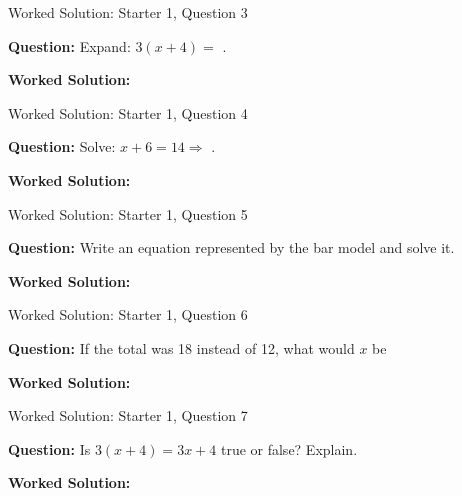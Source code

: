 \documentclass{beamer}
\newcommand{\ablank}[1]{%
  \alt<2>{\textcolor{red}{#1}}{\underline{\phantom{#1}}}%
}
\newcommand{\ashow}[1]{\uncover<2->{\textcolor{red}{\small #1}}}
\newcommand{\ashowq}[1]{\alt<2->{\textcolor{red}{\small #1}}{?}}
\begin{document}
\begin{frame}{Worked Solution: Starter 1, Question 3}

\textbf{Question:} Expand: $3(x+4)=$\ablank{$3x+12$}.

\textbf{Worked Solution:} \ashow{Multiply each term inside the bracket by $3$: $3(x+4)=3x+12$.}

\end{frame}

\begin{frame}{Worked Solution: Starter 1, Question 4}

\textbf{Question:} Solve: $x+6=14 \Rightarrow$\ablank{$x=8$}.

\textbf{Worked Solution:} \ashow{Subtract $6$ from both sides: $x=14-6=8$.}

\end{frame}

\begin{frame}{Worked Solution: Starter 1, Question 5}

\textbf{Question:} Write an equation represented by the bar model and solve it.

\textbf{Worked Solution:} \ashow{The two $x$-blocks and the $4$-block make the total $12$, so $2x+4=12$. Subtract $4$: $2x=8$; divide by $2$: $x=4$.}

\end{frame}

\begin{frame}{Worked Solution: Starter 1, Question 6}

\textbf{Question:} If the total was 18 instead of 12, what would $x$ be\ashowq{~$x=7$.}

\textbf{Worked Solution:} \ashow{The model becomes $2x+4=18$. Subtract $4$: $2x=14$, so $x=7$.}

\end{frame}

\begin{frame}{Worked Solution: Starter 1, Question 7}

\textbf{Question:} Is $3(x+4)=3x+4$ true or false? Explain.

\textbf{Worked Solution:} \ashow{False. Expanding $3(x+4)$ gives $3x+12$, not $3x+4$.}

\end{frame}
\end{document}
